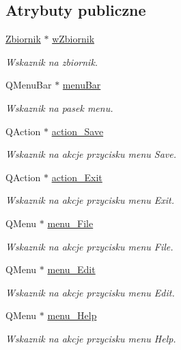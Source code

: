 \subsection*{Atrybuty publiczne}
\begin{DoxyCompactItemize}
\item 
\hyperlink{class_zbiornik}{Zbiornik} $\ast$ \hyperlink{class_okno_glowne_af2d1275209898ebdd5ab9de8ef78dffd}{w\+Zbiornik}
\begin{DoxyCompactList}\small\item\em Wskaznik na zbiornik. \end{DoxyCompactList}\item 
Q\+Menu\+Bar $\ast$ \hyperlink{class_okno_glowne_a5a87098d9d4bd868670f5a5e72023a0a}{menu\+Bar}
\begin{DoxyCompactList}\small\item\em Wskaznik na pasek menu. \end{DoxyCompactList}\item 
Q\+Action $\ast$ \hyperlink{class_okno_glowne_a2c2d825b6e5e0faa5eb368be4fc73b78}{action\+\_\+\+Save}
\begin{DoxyCompactList}\small\item\em Wskaznik na akcje przycisku menu Save. \end{DoxyCompactList}\item 
Q\+Action $\ast$ \hyperlink{class_okno_glowne_a579ef9901f57057368cb522ea5a9a5c3}{action\+\_\+\+Exit}
\begin{DoxyCompactList}\small\item\em Wskaznik na akcje przycisku menu Exit. \end{DoxyCompactList}\item 
Q\+Menu $\ast$ \hyperlink{class_okno_glowne_a1ba162db2d0b06b0f8963e61b3806875}{menu\+\_\+\+File}
\begin{DoxyCompactList}\small\item\em Wskaznik na akcje przycisku menu File. \end{DoxyCompactList}\item 
Q\+Menu $\ast$ \hyperlink{class_okno_glowne_a93afadd0ec22ce6a7e29acc5dd2423a2}{menu\+\_\+\+Edit}
\begin{DoxyCompactList}\small\item\em Wskaznik na akcje przycisku menu Edit. \end{DoxyCompactList}\item 
Q\+Menu $\ast$ \hyperlink{class_okno_glowne_ab17be6714913af0cdf4e7de7cb6210d1}{menu\+\_\+\+Help}
\begin{DoxyCompactList}\small\item\em Wskaznik na akcje przycisku menu Help. \end{DoxyCompactList}\item 

\end{DoxyCompactItemize}
